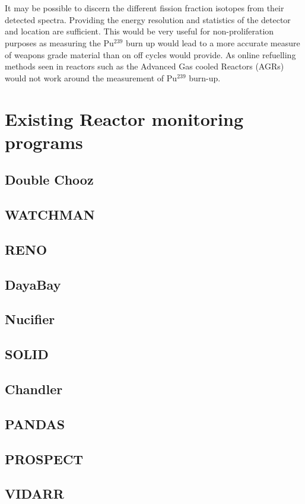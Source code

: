 \documentclass[12pt,a4paper]{article}
\begin{document}
\\\\It may be possible to discern the different fission fraction isotopes from their detected spectra. Providing the energy resolution and statistics of the detector and location are sufficient. This would be very useful for non-proliferation purposes as measuring the Pu$^{239}$ burn up would lead to a more accurate measure of weapons grade material than on off cycles would provide. As online refuelling methods seen in reactors such as the Advanced Gas cooled Reactors (AGRs) would not work around the measurement of Pu$^{239}$ burn-up. 

\section{Existing Reactor monitoring programs}
\subsection{Double Chooz}
\subsection{WATCHMAN}
\subsection{RENO}
\subsection{DayaBay}
\subsection{Nucifier}
\subsection{SOLID}
\subsection{Chandler}
\subsection{PANDAS}
\subsection{PROSPECT}
\subsection{VIDARR}

% 
%
\printbibliography
\end{document}
